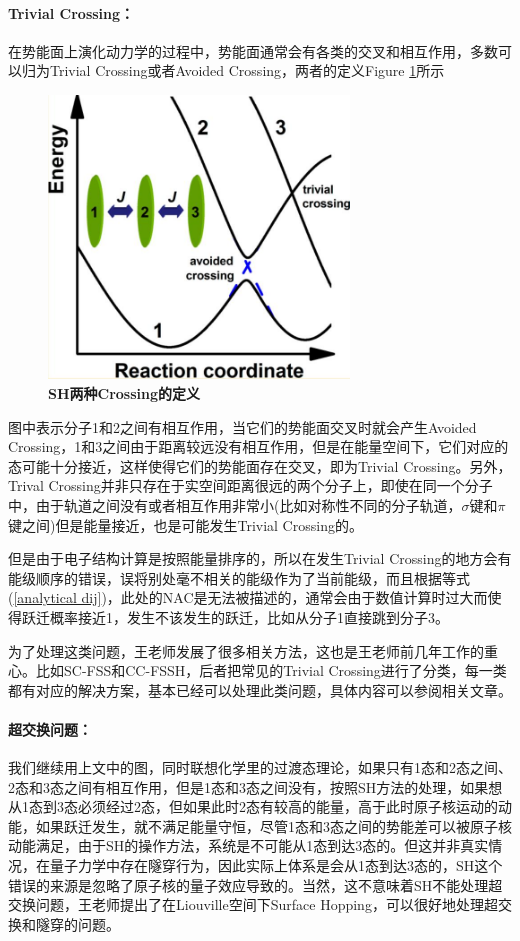 \documentclass[12pt,a4paper,openany,twoside]{book}
\numberwithin{equation}{section}
\begin{document}
        \paragraph{Trivial Crossing：}在势能面上演化动力学的过程中，势能面通常会有各类的交叉和相互作用，多数可以归为Trivial Crossing或者Avoided Crossing，两者的定义Figure \ref{two kinds of crossing}所示
        \begin{figure}
          \centering
          \label{two kinds of crossing}
          \includegraphics[width = 8cm]{fig/crossing.jpg}
          \caption{\textbf{SH两种Crossing的定义}}
        \end{figure}
        图中表示分子1和2之间有相互作用，当它们的势能面交叉时就会产生Avoided Crossing，1和3之间由于距离较远没有相互作用，但是在能量空间下，它们对应的态可能十分接近，这样使得它们的势能面存在交叉，即为Trivial Crossing。另外，Trival Crossing并非只存在于实空间距离很远的两个分子上，即使在同一个分子中，由于轨道之间没有或者相互作用非常小(比如对称性不同的分子轨道，$\sigma$键和$\pi$键之间)但是能量接近，也是可能发生Trivial Crossing的。

        但是由于电子结构计算是按照能量排序的，所以在发生Trivial Crossing的地方会有能级顺序的错误，误将别处毫不相关的能级作为了当前能级，而且根据等式(\ref{analytical dij})，此处的NAC是无法被描述的，通常会由于数值计算时过大而使得跃迁概率接近1，发生不该发生的跃迁，比如从分子1直接跳到分子3。

        为了处理这类问题，王老师发展了很多相关方法，这也是王老师前几年工作的重心。比如SC-FSS和CC-FSSH，后者把常见的Trivial Crossing进行了分类，每一类都有对应的解决方案，基本已经可以处理此类问题，具体内容可以参阅相关文章\cite{wang2014simple}\cite{Qiu2018}\cite{Bai2018}。

        \paragraph{超交换问题：}我们继续用上文中的图，同时联想化学里的过渡态理论，如果只有1态和2态之间、2态和3态之间有相互作用，但是1态和3态之间没有，按照SH方法的处理，如果想从1态到3态必须经过2态，但如果此时2态有较高的能量，高于此时原子核运动的动能，如果跃迁发生，就不满足能量守恒，尽管1态和3态之间的势能差可以被原子核动能满足，由于SH的操作方法，系统是不可能从1态到达3态的。但这并非真实情况，在量子力学中存在隧穿行为，因此实际上体系是会从1态到达3态的，SH这个错误的来源是忽略了原子核的量子效应导致的。当然，这不意味着SH不能处理超交换问题，王老师提出了在Liouville空间下Surface Hopping\cite{wang2015fewest}，可以很好地处理超交换和隧穿的问题。
\end{document}
